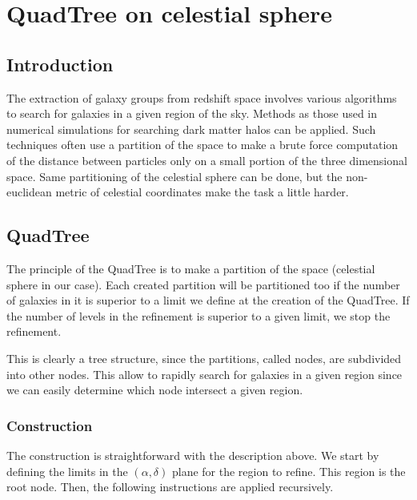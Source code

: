 \chapter{QuadTree on celestial sphere}
\label{cha:quadtree}

\section{Introduction}

The extraction of galaxy groups from redshift space involves various algorithms
to search for galaxies in a given region of the sky. Methods as those used in
numerical simulations for searching dark matter halos can be applied. Such
techniques often use a partition of the space to make a brute force computation
of the distance between particles only on a small portion of the three
dimensional space. Same partitioning of the celestial sphere can be done, but
the non-euclidean metric of celestial coordinates make the task a little
harder.

\section{QuadTree}

The principle of the QuadTree is to make a partition of the space (celestial
sphere in our case). Each created partition will be partitioned too if the
number of galaxies in it is superior to a limit we define at the creation of
the QuadTree. If the number of levels in the refinement is superior to a given
limit, we stop the refinement.

This is clearly a tree structure, since the partitions, called nodes, are
subdivided into other nodes. This allow to rapidly search for galaxies in a
given region since we can easily determine which node intersect a given region.

\subsection{Construction}

The construction is straightforward with the description above. We start by
defining the limits in the $(\alpha, \delta)$ plane for the region to refine.
This region is the root node. Then, the following instructions are applied
recursively.

